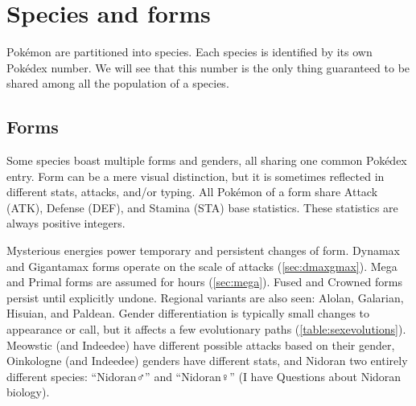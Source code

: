 \chapter{Species and forms\label{chap:species}}
Pokémon are partitioned into species.
Each species is identified by its own Pokédex number.
We will see that this number is the only thing guaranteed to be shared among all the population of a species.

\section{Forms\label{sec:forms}}
Some species boast multiple forms and genders, all sharing one common Pokédex entry.
Form can be a mere visual distinction, but it is sometimes reflected in different stats,
 attacks, and/or typing.
All Pokémon of a form share Attack (ATK), Defense (DEF), and Stamina (STA) base statistics.
These statistics are always positive integers.

Mysterious energies power temporary and persistent changes of form.
Dynamax and Gigantamax forms operate on the scale of attacks (\autoref{sec:dmaxgmax}).
Mega and Primal forms are assumed for hours (\autoref{sec:mega}).
Fused and Crowned forms persist until explicitly undone.
Regional variants are also seen: Alolan, Galarian, Hisuian, and Paldean.
Gender differentiation is typically small changes to appearance or call,
 but it affects a few evolutionary paths (\autoref{table:sexevolutions}).
Meowstic (and Indeedee) have different possible attacks based on their gender,
 Oinkologne (and Indeedee) genders have different stats, and Nidoran two entirely different
 species: ``Nidoran♂'' and ``Nidoran♀'' (I have Questions about Nidoran biology).

